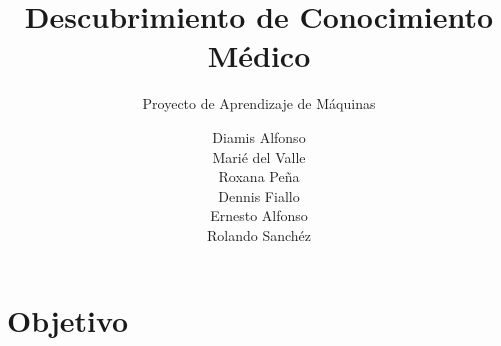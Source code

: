\documentclass[
11pt, %
%
aspectratio=169, %
]{beamer}
\title[Descubrimiento de Conocimiento M\'edico]{Descubrimiento de Conocimiento M\'edico}
\subtitle{Proyecto de Aprendizaje de M\'aquinas}
\author[]{Diamis Alfonso \\ Mari\'e del Valle \\ Roxana Pe\~na \\ Dennis Fiallo \\ Ernesto Alfonso \\ Rolando Sanch\'ez}
\date{}
\begin{document}
	
	\section{}
	\begin{frame}
		\titlepage %
		
	\end{frame}
	
	
	
	\section{Objetivo} %
	
\end{document}
